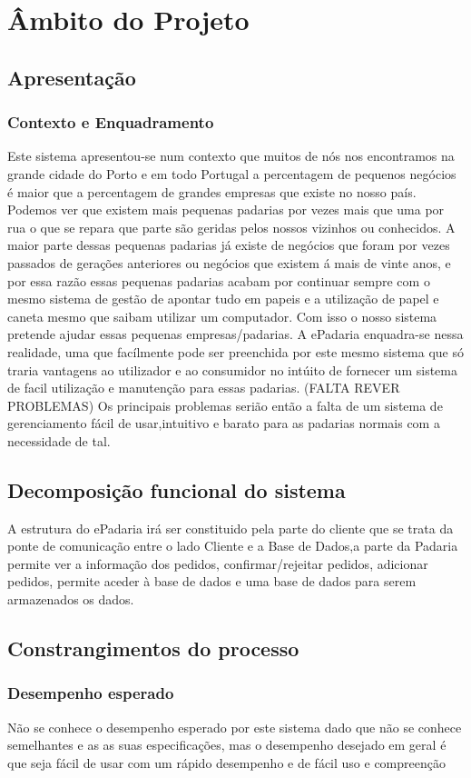 \chapter{Âmbito do Projeto}
\label{ambito}
\section{Apresentação}
\subsection{Contexto e Enquadramento}
Este sistema apresentou-se num contexto que muitos de nós nos encontramos na grande cidade do Porto e em todo Portugal a percentagem de pequenos negócios é maior que a percentagem de grandes empresas que existe no nosso país. Podemos ver que existem mais pequenas padarias por vezes mais que uma por rua o que se repara que parte são geridas pelos nossos vizinhos ou conhecidos. A maior parte dessas pequenas padarias já existe de negócios que foram por vezes passados de gerações anteriores ou negócios que existem á mais de vinte anos, e por essa razão essas pequenas padarias acabam por continuar sempre com o mesmo sistema de gestão de apontar tudo em papeis e a utilização de papel e caneta mesmo que saibam utilizar um computador. Com isso o nosso sistema pretende ajudar essas pequenas empresas/padarias.
A ePadaria enquadra-se nessa realidade, uma que facílmente pode ser preenchida por este mesmo sistema que só traria vantagens ao utilizador e ao consumidor no intúito de fornecer um sistema de facil utilização e manutenção para essas padarias.
(FALTA REVER PROBLEMAS)
Os principais problemas serião então a falta de um sistema de gerenciamento fácil de usar,intuitivo e barato para as padarias normais com a necessidade de tal.
\section{Decomposição funcional do sistema}
A estrutura do ePadaria irá ser constituido pela parte do cliente que se trata da ponte de comunicação entre o lado Cliente e a Base de Dados,a parte da Padaria permite ver a informação dos pedidos, confirmar/rejeitar pedidos, adicionar pedidos, permite aceder à base de dados e uma base de dados para serem armazenados os dados.
\section{Constrangimentos do processo}
\subsection{Desempenho esperado}
Não se conhece o desempenho esperado por este sistema dado que não se conhece semelhantes e as as suas especificações, mas o desempenho desejado em geral é que seja fácil de usar com um rápido desempenho e de fácil uso e compreenção
